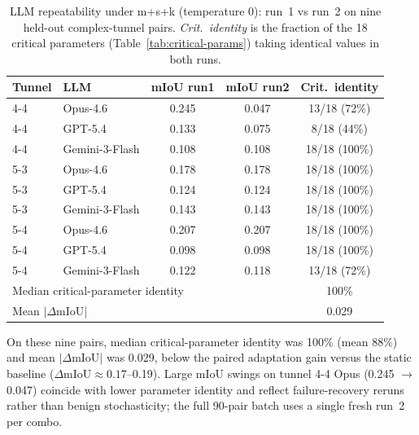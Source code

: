 \begin{table}[ht]
\caption{LLM repeatability under m+s+k (temperature 0): run~1 vs run~2 on nine held-out complex-tunnel pairs. \emph{Crit.\ identity} is the fraction of the 18 critical parameters (Table~\ref{tab:critical-params}) taking identical values in both runs.}\label{tab:repeatability}
\begin{tabular*}{\tblwidth}{@{} l l c c c @{}}
\toprule
Tunnel & LLM & mIoU run1 & mIoU run2 & Crit.\ identity \\
\midrule
4-4 & Opus-4.6 & 0.245 & 0.047 & 13/18 (72\%) \\
4-4 & GPT-5.4 & 0.133 & 0.075 & 8/18 (44\%) \\
4-4 & Gemini-3-Flash & 0.108 & 0.108 & 18/18 (100\%) \\
5-3 & Opus-4.6 & 0.178 & 0.178 & 18/18 (100\%) \\
5-3 & GPT-5.4 & 0.124 & 0.124 & 18/18 (100\%) \\
5-3 & Gemini-3-Flash & 0.143 & 0.143 & 18/18 (100\%) \\
5-4 & Opus-4.6 & 0.207 & 0.207 & 18/18 (100\%) \\
5-4 & GPT-5.4 & 0.098 & 0.098 & 18/18 (100\%) \\
5-4 & Gemini-3-Flash & 0.122 & 0.118 & 13/18 (72\%) \\
\midrule
\multicolumn{4}{l}{Median critical-parameter identity} & 100\% \\
\multicolumn{4}{l}{Mean $|\Delta$mIoU|} & 0.029 \\
\bottomrule
\end{tabular*}
\end{table}

\noindent On these nine pairs, median critical-parameter identity was 100\% (mean 88\%) and mean $|\Delta\mathrm{mIoU}|$ was 0.029, below the paired adaptation gain versus the static baseline ($\Delta\mathrm{mIoU} \approx 0.17$--0.19). Large mIoU swings on tunnel 4-4 Opus (0.245 $\rightarrow$ 0.047) coincide with lower parameter identity and reflect failure-recovery reruns rather than benign stochasticity; the full 90-pair batch uses a single fresh run~2 per combo.
